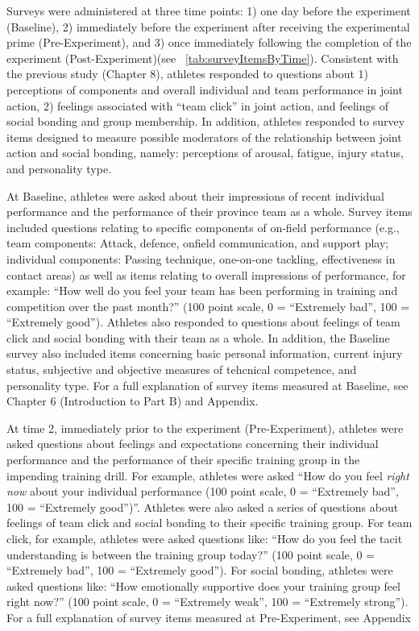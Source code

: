     


Surveys were administered at three time points: 1) one day before the experiment (Baseline), 2) immediately before the experiment after receiving the experimental prime (Pre-Experiment), and 3) once immediately following the completion of the experiment (Post-Experiment)(see ~\ref{tab:surveyItemsByTime}).  Consistent with the previous study (Chapter 8), athletes responded to questions about 1) perceptions of components and overall individual and team performance in joint action, 2) feelings associated with ``team click'' in joint action, and feelings of social bonding and group membership.  In addition, athletes responded to survey items designed to measure possible moderators of the relationship between joint action and social bonding, namely: perceptions of arousal, fatigue, injury status, and personality type.

At Baseline, athletes were asked about their impressions of recent individual performance and the performance of their province team as a whole.  Survey items included questions relating to specific components of on-field performance (e.g., team components: Attack, defence, onfield communication, and support play; individual components: Passing technique, one-on-one tackling, effectiveness in contact areas) as well as items relating to overall impressions of performance, for example: ``How well do you feel your team has been performing in training and competition over the past month?'' (100 point scale, 0 = ``Extremely bad'', 100 = ``Extremely good'').  Athletes also responded to questions about feelings of team click and social bonding with their team as a whole. In addition, the Baseline survey also included items concerning basic personal information, current injury status, subjective and objective measures of tehcnical competence, and personality type.
For a full explanation of survey items measured at Baseline, see Chapter 6 (Introduction to Part B) and Appendix.

At time 2, immediately prior to the experiment (Pre-Experiment), athletes were asked questions about feelings and expectations concerning their individual performance and the performance of their specific training group in the impending training drill.
For example,  athletes were asked ``How do you feel \textit{right now} about your individual performance (100 point scale, 0 = ``Extremely bad'', 100 = ``Extremely good'')''.  Athletes were also asked a series of questions about feelings of team click and social bonding to their specific training group. For team click, for example, athletes were asked questions like: ``How do you feel the tacit understanding is between the training group today?'' (100 point scale, 0 = ``Extremely bad'', 100 = ``Extremely good'').  For social bonding, athletes were asked questions like: ``How emotionally supportive does your training group feel right now?'' (100 point scale, 0 = ``Extremely weak'', 100 = ``Extremely strong'').
For a full explanation of survey items measured at Pre-Experiment, see Appendix


